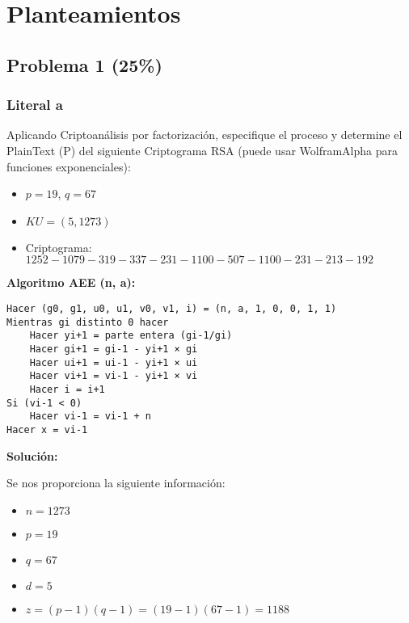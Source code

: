\chapter[Planteamientos]{Planteamientos}

{
\parindent0pt



\vspace{.935em}

\section{Problema 1 (25\%)}

\subsection{Literal a}
Aplicando Criptoanálisis por factorización, especifique el proceso y determine el PlainText (P) del siguiente Criptograma RSA (puede usar WolframAlpha para funciones exponenciales):

\begin{itemize}[leftmargin=*]
    \item $p=19$, $q=67$
    \item $KU=(5,1273)$
    \item Criptograma: $1252-1079-319-337-231-1100-507-1100-231-213-192$
\end{itemize}

\textbf{Algoritmo AEE (n, a):}
\begin{lstlisting}[basicstyle=\ttfamily]
Hacer (g0, g1, u0, u1, v0, v1, i) = (n, a, 1, 0, 0, 1, 1)
Mientras gi distinto 0 hacer
    Hacer yi+1 = parte entera (gi-1/gi)
    Hacer gi+1 = gi-1 - yi+1 × gi
    Hacer ui+1 = ui-1 - yi+1 × ui
    Hacer vi+1 = vi-1 - yi+1 × vi
    Hacer i = i+1
Si (vi-1 < 0)
    Hacer vi-1 = vi-1 + n
Hacer x = vi-1
\end{lstlisting}




\textbf{Solución:}


Se nos proporciona la siguiente información:

\begin{itemize}
\item $n = 1273$
\item $p = 19$
\item $q = 67$
\item $d = 5$
\item $z = (p-1)(q-1) = (19-1)(67-1) = 1188$
\end{itemize}

}
